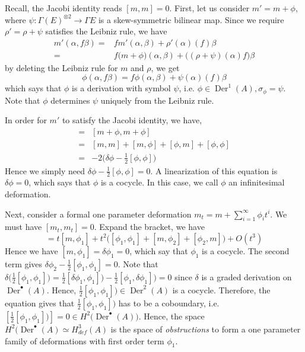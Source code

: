 \documentclass[12pt]{amsart}
\theoremstyle{definition}
\theoremstyle{remark}
\numberwithin{equation}{section}
\newcommand{\1}{{\mathbb{1}}}
\newcommand{\der}{\operatorname{Der}}
\begin{document}
Recall, the Jacobi identity reads $[m,m]=0$. First, let us consider $m'=m+\phi$, where $\psi:\Gamma(E)^{\otimes 2}\to \Gamma E$ is a skew-symmetric bilinear map. Since we require $\rho'=\rho+\psi$ satisfies the Leibniz rule, we have 
\begin{align*}
m'(\alpha, f\beta)=&fm'(\alpha, \beta)+\rho'(\alpha)(f)\beta\\
=& f\big(m+\phi\big)(\alpha,\beta)+\big((\rho+\psi)(\alpha)f \big)\beta
\end{align*} 
by deleting the Leibniz rule for $m$ and $\rho$, we get
\begin{equation*}
\phi(\alpha, f\beta)=f\phi(\alpha,\beta)+\psi(\alpha)(f)\beta
\end{equation*}
which says that $\phi$ is a derivation with symbol $\psi$, i.e. $\phi\in \der^1(A), \sigma_{\phi}=\psi$. Note that $\phi$ determines $\psi$ uniquely from the Leibniz rule.

In order for $m'$ to satisfy the Jacobi identity, we have,
\begin{align*}
[m',m']=&[m+\phi,m+\phi]\\
=& [m,m]+[m,\phi]+[\phi,m]+[\phi,\phi]\\
=&-2\big(\delta \phi-\frac{1}{2}[\phi,\phi] \big)
\end{align*} 
Hence we simply need $\delta \phi-\frac{1}{2}[\phi,\phi] =0$. A linearization of this equation is $\delta \phi=0$, which says that $\phi$ is a cocycle. In this case, we call $\phi$ an infinitesimal deformation. 

Next, consider a formal one parameter deformation $m_t=m+\sum_{i=1}^{\infty}\phi_i t^i$. We must have $[m_t,m_t]=0$. Expand the bracket, we have 
\begin{equation*}
[m_t,m_t]=t[m,\phi_1]+t^2\big([\phi_1,\phi_1]+[m,\phi_2]+[\phi_2,m]\big)+O(t^3)
\end{equation*}
Hence we have $[m,\phi_1]=\delta \phi_1=0$, which say that $\phi_1$ is a cocycle. The second term gives $\delta \phi_2-\frac{1}{2}[\phi_1,\phi_1]=0$. Note that $\delta\big( \frac{1}{2}[\phi_1,\phi_1]\big)=\frac{1}{2}[\delta \phi_1,\phi_1]\big)-\frac{1}{2}[\phi_1,\delta\phi_1]\big)=0$ since $\delta$ is a graded derivation on $\der^{\bullet}(A)$. Hence, $\frac{1}{2}[\phi_1,\phi_1]\big)\in \der^2(A)$ is a cocycle. Therefore, the equation gives that $\frac{1}{2}[\phi_1,\phi_1]\big)$ has to be a coboundary, i.e. $[\frac{1}{2}[\phi_1,\phi_1]\big)]=0\in H^2\big(\der^{\bullet}(A) \big)$. Hence, the space $H^2\big(\der^{\bullet}(A)\simeq H^3_{def}(A)$ is the space of {\it obstructions} to form a one parameter family of deformations with first order term $\phi_1$.
\end{document}
